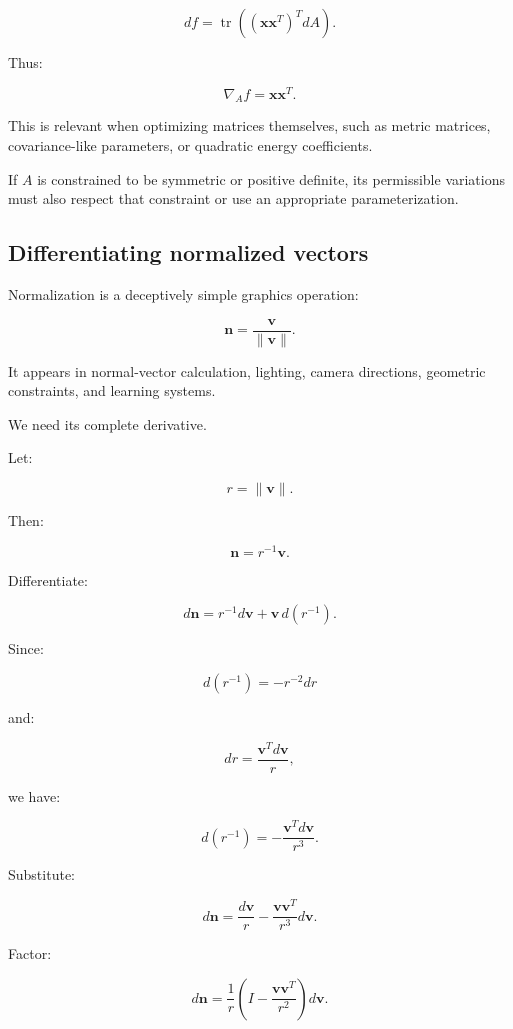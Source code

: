 \[
df= \operatorname{tr}((\mathbf x\mathbf x^T)^TdA).
\]

Thus:

\[
\boxed{ \nabla_Af=\mathbf x\mathbf x^T }.
\]

This is relevant when optimizing matrices themselves, such as metric matrices, covariance-like parameters, or quadratic energy coefficients.

If \(A\) is constrained to be symmetric or positive definite, its permissible variations must also respect that constraint or use an appropriate parameterization.

\subsection{Differentiating normalized vectors}\label{02-foundations-ii-ch027-differentiating-normalized-vectors}

\hypertarget{02-foundations-ii-ch027-differentiating-normalized-vectors}{}

Normalization is a deceptively simple graphics operation:

\[
\mathbf n= \frac{\mathbf v}{\|\mathbf v\|}.
\]

It appears in normal-vector calculation, lighting, camera directions, geometric constraints, and learning systems.

We need its complete derivative.

Let:

\[
r=\|\mathbf v\|.
\]

Then:

\[
\mathbf n=r^{-1}\mathbf v.
\]

Differentiate:

\[
d\mathbf n = r^{-1}d\mathbf v+ \mathbf v\,d(r^{-1}).
\]

Since:

\[
d(r^{-1})=-r^{-2}dr
\]

and:

\[
dr=\frac{\mathbf v^Td\mathbf v}{r},
\]

we have:

\[
d(r^{-1}) = -\frac{\mathbf v^Td\mathbf v}{r^3}.
\]

Substitute:

\[
d\mathbf n= \frac{d\mathbf v}{r} - \frac{\mathbf v\mathbf v^T}{r^3}d\mathbf v.
\]

Factor:

\[
d\mathbf n= \frac1r \left( I-\frac{\mathbf v\mathbf v^T}{r^2} \right)d\mathbf v.
\]

